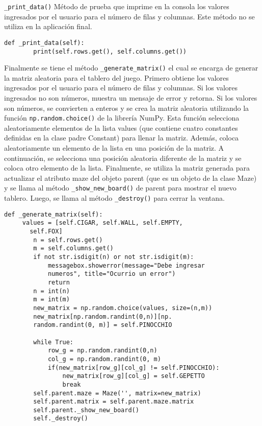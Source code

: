 \lstinline{_print_data()} Método de prueba que imprime en la consola los valores ingresados por el usuario para el número de filas y columnas. Este método no se utiliza en la aplicación final.\\
\begin{lstlisting}
def _print_data(self):
        print(self.rows.get(), self.columns.get())
\end{lstlisting}
\clearpage 
Finalmente se tiene el método \lstinline{_generate_matrix()} el cual se encarga de generar la matriz aleatoria para el tablero del juego. Primero obtiene los valores ingresados por el usuario para el número de filas y columnas. Si los valores ingresados no son números, muestra un mensaje de error y retorna. Si los valores son números, se convierten a enteros y se crea la matriz aleatoria utilizando la función \lstinline{np.random.choice()} de la librería NumPy. Esta función selecciona aleatoriamente elementos de la lista values (que contiene cuatro constantes definidas en la clase padre Constant) para llenar la matriz. Además, coloca aleatoriamente un elemento de la lista en una posición de la matriz. A continuación, se selecciona una posición aleatoria diferente de la matriz y se coloca otro elemento de la lista. Finalmente, se utiliza la matriz generada para actualizar el atributo maze del objeto parent (que es un objeto de la clase Maze) y se llama al método \lstinline{_show_new_board()} de parent para mostrar el nuevo tablero. Luego, se llama al método \lstinline{_destroy()} para cerrar la ventana.\\
\begin{lstlisting}
def _generate_matrix(self):
     values = [self.CIGAR, self.WALL, self.EMPTY,
       self.FOX]
        n = self.rows.get()
        m = self.columns.get()
        if not str.isdigit(n) or not str.isdigit(m):
            messagebox.showerror(message="Debe ingresar
            numeros", title="Ocurrio un error")
            return
        n = int(n)
        m = int(m)
        new_matrix = np.random.choice(values, size=(n,m))
        new_matrix[np.random.randint(0,n)][np.
        random.randint(0, m)] = self.PINOCCHIO

        while True:
            row_g = np.random.randint(0,n)
            col_g = np.random.randint(0, m)
            if(new_matrix[row_g][col_g] != self.PINOCCHIO):
                new_matrix[row_g][col_g] = self.GEPETTO
                break
        self.parent.maze = Maze('', matrix=new_matrix)
        self.parent.matrix = self.parent.maze.matrix
        self.parent._show_new_board()
        self._destroy()
\end{lstlisting}

